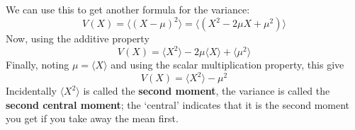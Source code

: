 \documentclass[11pt,a4paper]{scrartcl}
\begin{document}
We can use this to get another formula for the variance:
\begin{equation}
V(X)=\langle (X-\mu)^2\rangle=\langle (X^2-2\mu X+\mu^2)\rangle
\end{equation}
Now, using the additive property
\begin{equation}
V(X)=\langle X^2 \rangle -2\mu\langle X\rangle +\langle \mu^2 \rangle
\end{equation}
Finally, noting $\mu=\langle X\rangle$ and using the scalar multiplication property, this give
\begin{equation}
V(X)=\langle X^2 \rangle - \mu^2 
\end{equation}
Incidentally $\langle X^2\rangle$ is called the \textbf{second
  moment}, the variance is called the \textbf{second central moment};
the \lq{}central\rq{} indicates that it is the second moment you get
if you take away the mean first.

\newpage


\end{document}
